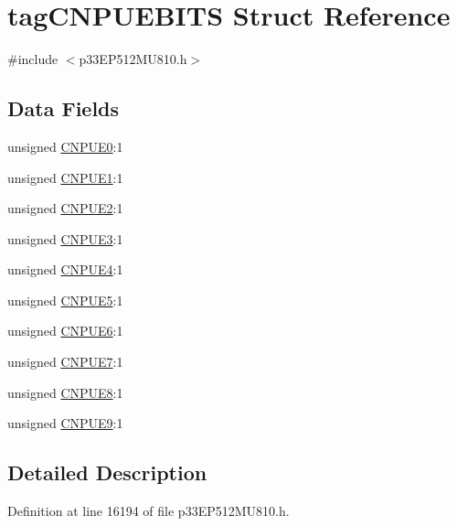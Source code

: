\hypertarget{structtag_c_n_p_u_e_b_i_t_s}{}\section{tag\+C\+N\+P\+U\+E\+B\+I\+TS Struct Reference}
\label{structtag_c_n_p_u_e_b_i_t_s}


{\ttfamily \#include $<$p33\+E\+P512\+M\+U810.\+h$>$}

\subsection*{Data Fields}
\begin{DoxyCompactItemize}
\item 
unsigned \hyperlink{structtag_c_n_p_u_e_b_i_t_s_a01113ad327bcc5979d7213d10c5c3fce}{C\+N\+P\+U\+E0}\+:1
\item 
unsigned \hyperlink{structtag_c_n_p_u_e_b_i_t_s_a4ad6893d920683e0bd684e95fb54be47}{C\+N\+P\+U\+E1}\+:1
\item 
unsigned \hyperlink{structtag_c_n_p_u_e_b_i_t_s_a25325b4cc33e9d4e900d80732ddef406}{C\+N\+P\+U\+E2}\+:1
\item 
unsigned \hyperlink{structtag_c_n_p_u_e_b_i_t_s_a65d3064f1ecc59f4ae33cdeb39e894a9}{C\+N\+P\+U\+E3}\+:1
\item 
unsigned \hyperlink{structtag_c_n_p_u_e_b_i_t_s_aeb1234e2317b04208f1ddd2338565eb6}{C\+N\+P\+U\+E4}\+:1
\item 
unsigned \hyperlink{structtag_c_n_p_u_e_b_i_t_s_a2445f2b2fd531800b9c7f43eea6665cf}{C\+N\+P\+U\+E5}\+:1
\item 
unsigned \hyperlink{structtag_c_n_p_u_e_b_i_t_s_ac3c4ffda1c1f7ae4bb2b04e64bd9788d}{C\+N\+P\+U\+E6}\+:1
\item 
unsigned \hyperlink{structtag_c_n_p_u_e_b_i_t_s_aee832be830e5768dc2b7065ff754b7a1}{C\+N\+P\+U\+E7}\+:1
\item 
unsigned \hyperlink{structtag_c_n_p_u_e_b_i_t_s_a1cda77913afbf99229124e22b9139f84}{C\+N\+P\+U\+E8}\+:1
\item 
unsigned \hyperlink{structtag_c_n_p_u_e_b_i_t_s_a471a24fd272f5564de0266b763b08d3b}{C\+N\+P\+U\+E9}\+:1
\end{DoxyCompactItemize}


\subsection{Detailed Description}


Definition at line 16194 of file p33\+E\+P512\+M\+U810.\+h.




